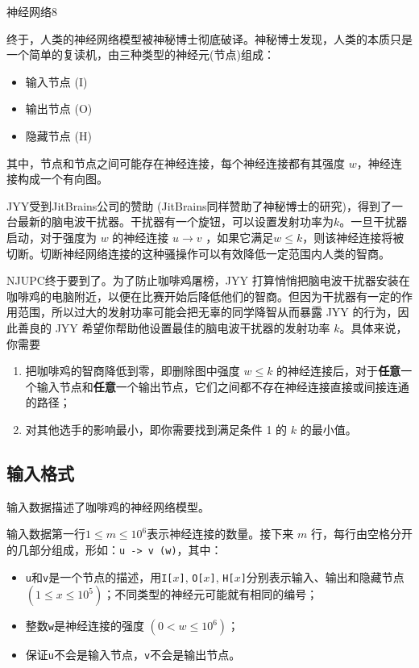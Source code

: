 \begin{Problem}{神经网络}{8}

终于，人类的神经网络模型被神秘博士彻底破译。神秘博士发现，人类的本质只是一个简单的复读机，由三种类型的神经元(节点)组成：

\begin{itemize}
\item 输入节点 (I)
\item 输出节点 (O)
\item 隐藏节点 (H)
\end{itemize}

其中，节点和节点之间可能存在神经连接，每个神经连接都有其强度 $w$，神经连接构成一个有向图。

JYY受到JitBrains公司的赞助 (JitBrains同样赞助了神秘博士的研究)，得到了一台最新的脑电波干扰器。干扰器有一个旋钮，可以设置发射功率为$k$。一旦干扰器启动，对于强度为 $w$ 的神经连接 $u \to v$ ，如果它满足$w \le k$，则该神经连接将被切断。切断神经网络连接的这种骚操作可以有效降低一定范围内人类的智商。

NJUPC终于要到了。为了防止咖啡鸡屠榜，JYY 打算悄悄把脑电波干扰器安装在咖啡鸡的电脑附近，以便在比赛开始后降低他们的智商。但因为干扰器有一定的作用范围，所以过大的发射功率可能会把无辜的同学降智从而暴露 JYY 的行为，因此善良的 JYY 希望你帮助他设置最佳的脑电波干扰器的发射功率 $k$。具体来说，你需要

\begin{enumerate}
\item 把咖啡鸡的智商降低到零，即删除图中强度 $w \le k$ 的神经连接后，对于\textbf{任意}一个输入节点和\textbf{任意}一个输出节点，它们之间都不存在神经连接直接或间接连通的路径；
\item 对其他选手的影响最小，即你需要找到满足条件 1 的 $k$ 的最小值。
\end{enumerate}

\subsection*{输入格式}

输入数据描述了咖啡鸡的神经网络模型。

输入数据第一行$1\le m \le 10^6$表示神经连接的数量。接下来 $m$ 行，每行由空格分开的几部分组成，形如：\texttt{u -> v (w)}，其中：

\begin{itemize}
\item \texttt{u}和\texttt{v}是一个节点的描述，用\texttt{I[$x$]}, \texttt{O[$x$]}, \texttt{H[$x$]}分别表示输入、输出和隐藏节点 $(1 \le x \le 10^5)$；不同类型的神经元可能就有相同的编号；
\item 整数\texttt{w}是神经连接的强度 $(0 < w \le 10^6)$；
\item 保证\texttt{u}不会是输入节点，\texttt{v}不会是输出节点。
\end{itemize}



\end{Problem}
